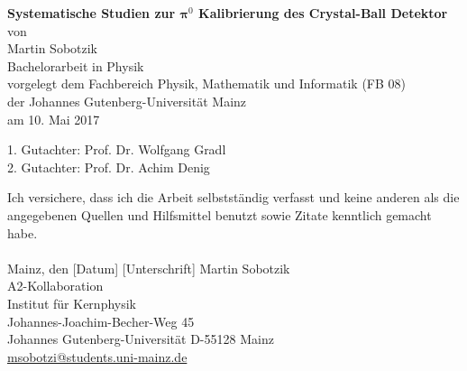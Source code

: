 \documentclass[a4paper,11pt,oneside,final,german,openbib,pdftex]{scrbook}
\begin{document}

\begin{titlepage}
  \vspace*{6mm}
  \begin{center}
     {\huge \bfseries Systematische Studien zur 
     	$
     										\boldsymbol{\pi}^0
     	$ 
     	Kalibrierung des Crystal-Ball Detektor}
     \\[3.5cm]
     {\large von}
     \\[3.5cm]
     {\dfont Martin Sobotzik}
     \\[2cm]
     {\large Bachelorarbeit in Physik \\
        vorgelegt dem Fachbereich Physik, Mathematik und Informatik (FB 08) \/\\
        der Johannes Gutenberg-Universit\"at Mainz \/\\
        am 10. Mai 2017}
   \end{center}
   \vfill
   1. Gutachter: Prof. Dr. Wolfgang Gradl\\	
   2. Gutachter: Prof. Dr. Achim Denig \\
   \vfill
\end{titlepage}

\thispagestyle{empty}
Ich versichere, dass ich die Arbeit selbstst\"andig verfasst und keine 
anderen als die angegebenen Quellen und Hilfsmittel benutzt sowie 
Zitate kenntlich gemacht habe.
\\
\\[3.5cm] 
Mainz, den [Datum] [Unterschrift]
\vfill
\noindent 
Martin Sobotzik\\
A2-Kollaboration\\
Institut f\"ur Kernphysik\\
Johannes-Joachim-Becher-Weg 45\\
Johannes Gutenberg-Universit\"at
D-55128 Mainz\\
{\url{ msobotzi@students.uni-mainz.de}}



\renewcommand\contentsname{Inhaltsverzeichnis}
\renewcommand\figurename{Abbildung}
\renewcommand\tablename{Tabelle}
\tableofcontents
\clearpage
\end{document}
